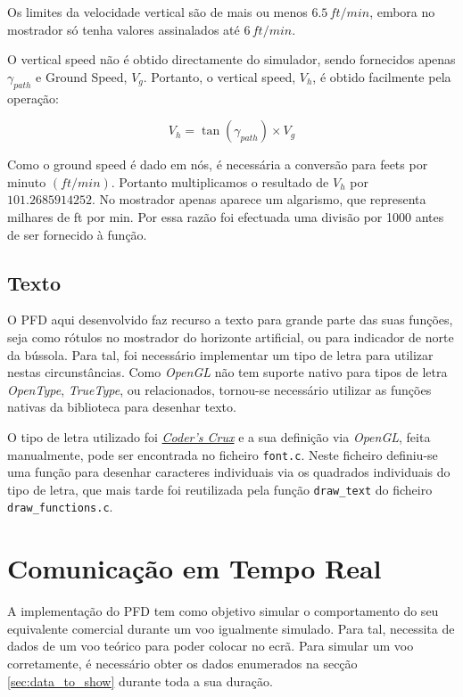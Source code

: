 \documentclass[palatino]{ist-report}
\begin{document}
Os limites da velocidade vertical são de mais ou menos $6.5\,ft/min$, embora no mostrador só tenha valores assinalados até $6\,ft/min$.


O vertical speed não é obtido directamente do simulador, sendo fornecidos apenas $\gamma_{path}$ e Ground Speed, $V_g$. Portanto, o vertical speed, $V_h$, é obtido facilmente pela operação:

\begin{equation*}
    V_h = \tan(\gamma_{path}) \times V_g
\end{equation*}

Como o ground speed é dado em nós, é necessária a conversão para feets por minuto $(ft/min)$. Portanto multiplicamos o resultado de $V_h$ por $101.2685914252$. No mostrador apenas aparece um algarismo, que representa milhares de ft por min. Por essa razão foi efectuada uma divisão por 1000 antes de ser fornecido à função. 

\subsection{Texto}

O PFD aqui desenvolvido faz recurso a texto para grande parte das suas funções, seja como rótulos no mostrador do horizonte artificial, ou para indicador de norte da bússola. Para tal, foi necessário implementar um tipo de letra para utilizar nestas circunstâncias. Como \textit{OpenGL} não tem suporte nativo para tipos de letra  \textit{OpenType}, \textit{TrueType}, ou relacionados, tornou-se necessário utilizar as funções nativas da biblioteca para desenhar texto.

O tipo de letra utilizado foi \href{https://www.dafont.com/coders-crux.font}{\textit{Coder's Crux}} e a sua definição via \textit{OpenGL}, feita manualmente, pode ser encontrada no ficheiro \texttt{font.c}. Neste ficheiro definiu-se uma função para desenhar caracteres individuais via os quadrados individuais do tipo de letra, que mais tarde foi reutilizada pela função \texttt{draw\_text} do ficheiro \texttt{draw\_functions.c}.

\section{Comunicação em Tempo Real}

A implementação do PFD tem como objetivo simular o comportamento do seu equivalente comercial durante um voo igualmente simulado. Para tal, necessita de dados de um voo teórico para poder colocar no ecrã. Para simular um voo corretamente, é necessário obter os dados enumerados na secção \ref{sec:data_to_show} durante toda a sua duração.
\end{document}
